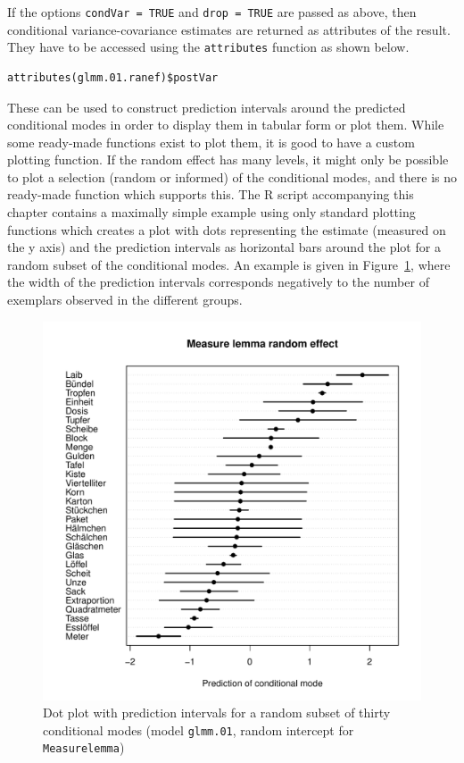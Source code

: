If the options \texttt{condVar = TRUE} and \texttt{drop = TRUE} are passed as above, then conditional variance-covariance estimates are returned as attributes of the result.
They have to be accessed using the \texttt{attributes} function as shown below.

\vspace{0.5\baselineskip}

\begin{lstlisting}
attributes(glmm.01.ranef)$postVar
\end{lstlisting}

These can be used to construct prediction intervals around the predicted conditional modes in order to display them in tabular form or plot them.
While some ready-made functions exist to plot them, it is good to have a custom plotting function.
If the random effect has many levels, it might only be possible to plot a selection (random or informed) of the conditional modes, and there is no ready-made function which supports this.
The R script accompanying this chapter contains a maximally simple example using only standard plotting functions which creates a plot with dots representing the estimate (measured on the y axis) and the prediction intervals as horizontal bars around the plot for a random subset of the conditional modes.
An example is given in Figure~\ref{fig:condmodes}, where the width of the prediction intervals corresponds negatively to the number of exemplars observed in the different groups.

\begin{figure}
  \centering
  \includegraphics[width=\textwidth]{RPHCL/ranef_selection}
  \caption{Dot plot with prediction intervals for a random subset of thirty conditional modes (model \texttt{glmm.01}, random intercept for \texttt{Measurelemma})}
  \label{fig:condmodes}
\end{figure}

